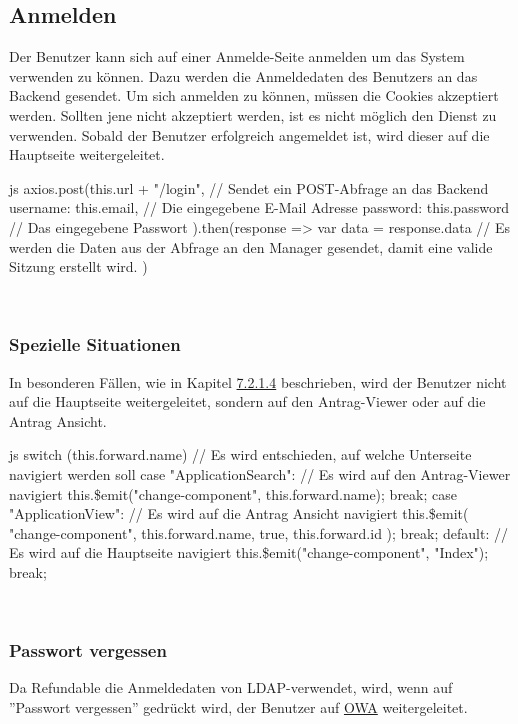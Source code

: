 \subsection{Anmelden}
Der Benutzer kann sich auf einer Anmelde-Seite anmelden um das System verwenden zu können. Dazu werden die Anmeldedaten des Benutzers an das Backend gesendet. Um sich anmelden zu können, müssen die Cookies akzeptiert werden. Sollten jene nicht akzeptiert werden, ist es nicht möglich den Dienst zu verwenden.
Sobald der Benutzer erfolgreich angemeldet ist, wird dieser auf die Hauptseite weitergeleitet.
\\
\begin{code}{js}
axios.post(this.url + "/login", {	// Sendet ein POST-Abfrage an das Backend
	username: this.email,	// Die eingegebene E-Mail Adresse
	password: this.password // Das eingegebene Passwort
}).then(response => {
	var data = response.data
	// Es werden die Daten aus der Abfrage an den Manager gesendet, damit eine valide Sitzung erstellt wird.
})
\end{code}
~\\

\subsubsection{Spezielle Situationen}
In besonderen Fällen, wie in Kapitel \hyperref[sec:antrag_viewer]{7.2.1.4} beschrieben, wird der Benutzer nicht auf die Hauptseite weitergeleitet, sondern auf den Antrag-Viewer oder auf die Antrag Ansicht.
\begin{code}{js}
switch (this.forward.name) {	// Es wird entschieden, auf welche Unterseite navigiert werden soll
	case "ApplicationSearch":	// Es wird auf den Antrag-Viewer navigiert
	this.\$emit("change-component", this.forward.name);
	break;
	case "ApplicationView":	// Es wird auf die Antrag Ansicht navigiert
	this.\$emit(
	"change-component",
	this.forward.name,
	true,
	this.forward.id
	);
	break;
	default:	// Es wird auf die Hauptseite navigiert
	this.\$emit("change-component", "Index");
	break;
}
\end{code}
~\\
\subsubsection{Passwort vergessen}
Da Refundable die Anmeldedaten von LDAP-verwendet, wird, wenn auf ''Passwort vergessen'' gedrückt wird, der Benutzer auf \href{https://owa.tgm.ac.at}{OWA} weitergeleitet.
\newpage
